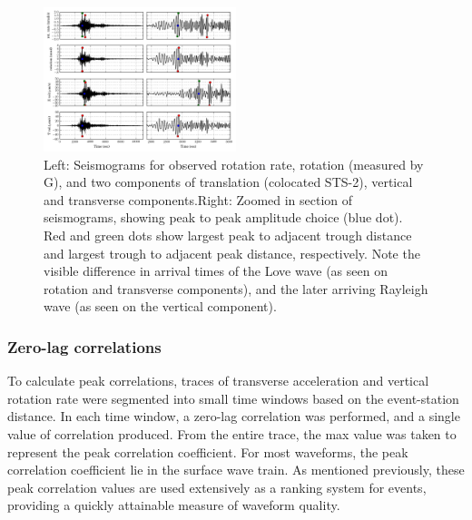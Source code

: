 \documentclass{gji}
\begin{document}
\begin{figure}
\centerline{\includegraphics[width=0.5\textwidth]{amp_picking}}
\caption{Left: Seismograms for observed rotation rate, rotation (measured by G), and two components of translation (colocated STS-2), vertical and transverse components.\newline Right: Zoomed in section of seismograms, showing peak to peak amplitude choice (blue dot). Red and green dots show largest peak to adjacent trough distance and largest trough to adjacent peak distance, respectively. Note the visible difference in arrival times of the Love wave (as seen on rotation and transverse components), and the later arriving Rayleigh wave (as seen on the vertical component). }
\label{fig:obswav}
\end{figure}


\subsubsection{Zero-lag correlations}
To calculate peak correlations, traces of transverse acceleration and vertical rotation rate were segmented into small time windows based on the event-station distance. In each time window, a zero-lag correlation was performed, and a single value of correlation produced. From the entire trace, the max value was taken to represent the peak correlation coefficient. For most waveforms, the peak correlation coefficient lie in the surface wave train. As mentioned previously, these peak correlation values are used extensively as a ranking system for events, providing a quickly attainable measure of waveform quality.
\end{document}
